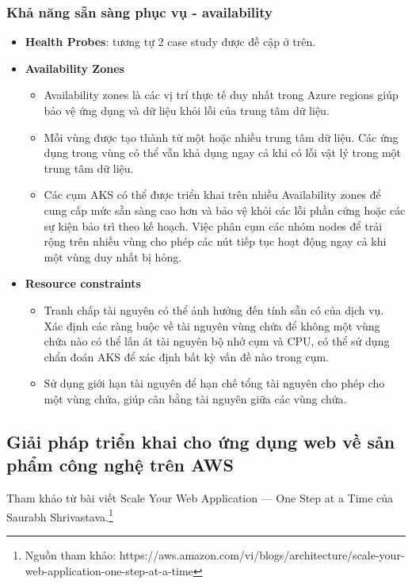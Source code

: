 \subsubsection{Khả năng sẵn sàng phục vụ - availability}
    \begin{itemize}
        \item \textbf{Health Probes}: tương tự 2 case study được đề cập ở trên.
        \item \textbf{Availability Zones}
            \begin{itemize}
                \item Availability zones là các vị trí thực tế duy nhất trong  Azure regions giúp bảo vệ ứng dụng và dữ liệu khỏi lỗi của trung tâm dữ liệu. 
                \item Mỗi vùng được tạo thành từ một hoặc nhiều trung tâm dữ liệu. Các ứng dụng trong vùng có thể vẫn khả dụng ngay cả khi có lỗi vật lý trong một trung tâm dữ liệu. 
                \item Các cụm AKS có thể được triển khai trên nhiều Availability zones để cung cấp mức sẵn sàng cao hơn và bảo vệ khỏi các lỗi phần cứng hoặc các sự kiện bảo trì theo kế hoạch. Việc phân cụm các nhóm nodes để trải rộng trên nhiều vùng cho phép các nút tiếp tục hoạt động ngay cả khi một vùng duy nhất bị hỏng.  
            \end{itemize}
        \item \textbf{Resource constraints}
            \begin{itemize}
                \item Tranh chấp tài nguyên có thể ảnh hưởng đến tính sẵn có của dịch vụ. Xác định các ràng buộc về tài nguyên vùng chứa để không một vùng chứa nào có thể lấn át tài nguyên bộ nhớ cụm và CPU, có thể sử dụng chẩn đoán AKS để xác định bất kỳ vấn đề nào trong cụm.
                \item Sử dụng giới hạn tài nguyên để hạn chế tổng tài nguyên cho phép cho một vùng chứa, giúp cân bằng tài nguyên giữa các vùng chứa. 
            \end{itemize}
    \end{itemize}
\subsection{Giải pháp triển khai cho ứng dụng web về sản phẩm công nghệ trên AWS}
\noindent Tham khảo từ bài viết Scale Your Web Application — One Step at a Time của Saurabh Shrivastava.\footnote{Nguồn tham khảo: https://aws.amazon.com/vi/blogs/architecture/scale-your-web-application-one-step-at-a-time}
